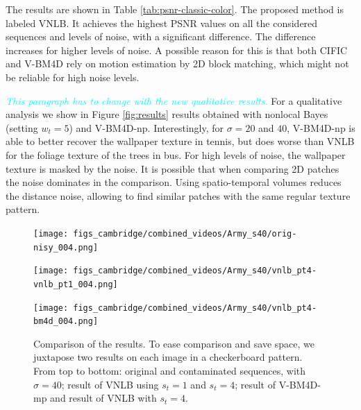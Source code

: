 \documentclass[10pt, journal, twocolumn, final, a4paper]{IEEEtran}
\newcommand{\pa}[1]{\textcolor{cyan}{#1}}
\newcommand{\pcomment}[1]{\textit{\pa{#1}}}
\begin{document}
The results are shown in Table \ref{tab:psnr-classic-color}. The proposed method is
labeled VNLB. It achieves the highest PSNR values on all the considered
sequences and levels of noise, with a significant difference. The difference
increases for higher levels of noise. A possible reason for this is that both 
CIFIC and V-BM4D rely on motion estimation by 2D block matching, which might
not be reliable for high noise levels.


\pcomment{This paragraph has to change with the new qualitative results.}
For a qualitative analysis we show in Figure \ref{fig:results} results obtained
with nonlocal Bayes (setting $w_t = 5$) and V-BM4D-np. Interestingly, for $\sigma = 20$
and $40$, V-BM4D-np is able to better recover the wallpaper texture in tennis,
but does worse than VNLB for the foliage texture of the trees in bus. 
For high levels of noise, the wallpaper texture is masked by the noise. 
It is possible that when comparing 2D patches the noise dominates in the
comparison. Using spatio-temporal volumes reduces the distance noise,
allowing to find similar patches with the same regular texture pattern.

\begin{figure}[htpb!]
	\centering

	\texttt{[image: figs\_cambridge/combined\_videos/Army\_s40/orig-nisy\_004.png]}

%
	\vspace{.1cm}
	\texttt{[image: figs\_cambridge/combined\_videos/Army\_s40/vnlb\_pt4-vnlb\_pt1\_004.png]}

	\vspace{.1cm}
	\texttt{[image: figs\_cambridge/combined\_videos/Army\_s40/vnlb\_pt4-bm4d\_004.png]}
	\caption{Comparison of the results. To ease comparison and save space, we
	juxtapose two results on each image in a checkerboard pattern. From top to
	bottom: original and contaminated sequences, with $\sigma = 40$; result of
	VNLB using $s_t = 1$ and $s_t = 4$; result of V-BM4D-mp and result of VNLB
	with $s_t = 4$.}
	\label{fig:results-army}
\end{figure}
\end{document}
